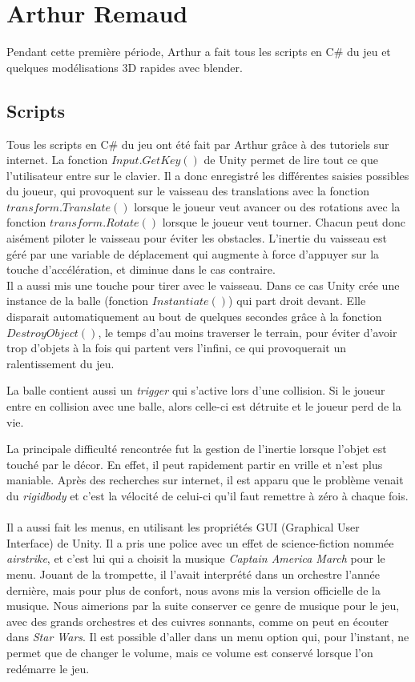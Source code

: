 \documentclass[10pt, titlepage]{report}
\begin{document}
\section{Arthur Remaud}
Pendant cette première période, Arthur a fait tous les scripts en C\# du jeu et quelques modélisations 3D rapides avec blender.

\subsection{Scripts}

Tous les scripts en C\# du jeu ont été fait par Arthur grâce à des tutoriels sur internet. La fonction $Input.GetKey()$ de Unity permet de lire tout ce que l'utilisateur entre sur le clavier. Il a donc enregistré les différentes saisies possibles du joueur, qui provoquent sur le vaisseau des translations avec la fonction $transform.Translate()$ lorsque le joueur veut avancer ou des rotations avec la fonction $transform.Rotate()$ lorsque le joueur veut tourner. Chacun peut donc aisément piloter le vaisseau pour éviter les obstacles. L'inertie du vaisseau est géré par une variable de déplacement qui augmente à force d'appuyer sur la touche d'accélération, et diminue dans le cas contraire.\\

Il a aussi mis une touche pour tirer avec le vaisseau. Dans ce cas Unity crée une instance de la balle (fonction $Instantiate()$) qui part droit devant. Elle disparait automatiquement au bout de quelques secondes grâce à la fonction $DestroyObject()$, le temps d'au moins traverser le terrain, pour éviter d'avoir trop d'objets à la fois qui partent vers l'infini, ce qui provoquerait un ralentissement du jeu.

La balle contient aussi un \textit{trigger} qui s'active lors d'une collision. Si le joueur entre en collision avec une balle, alors celle-ci est détruite et le joueur perd de la vie.

La principale difficulté rencontrée fut la gestion de l'inertie lorsque l'objet est touché par le décor. En effet, il peut rapidement partir en vrille et n'est plus maniable. Après des recherches sur internet, il est apparu que le problème venait du \textit{rigidbody} et c'est la vélocité de celui-ci qu'il faut remettre à zéro à chaque fois.\\ \\

 Il a aussi fait les menus, en utilisant les propriétés GUI (Graphical User Interface) de Unity. Il a pris une police avec un effet de science-fiction nommée \textit{airstrike}, et c'est lui qui a choisit la musique \textit{Captain America March} pour le menu. Jouant de la trompette, il l'avait interprété dans un orchestre l'année dernière, mais pour plus de confort, nous avons mis la version officielle de la musique. Nous aimerions par la suite conserver ce genre de musique pour le jeu, avec des grands orchestres et des cuivres sonnants, comme on peut en écouter dans \textit{Star Wars}. Il est possible d'aller dans un menu option qui, pour l'instant, ne permet que de changer le volume, mais ce volume est conservé lorsque l'on redémarre le jeu.
\end{document}
